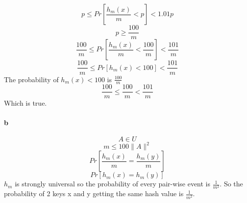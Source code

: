 \subsection*{}

\begin{equation}
    p \le Pr\left[ \frac{h_{m}(x)}{m} < p \right] < 1.01p
\end{equation}
\begin{equation}
    p \ge \frac{100}{m}
\end{equation}
\begin{equation}
    \frac{100}{m} \le Pr\left[ \frac{h_{m}(x)}{m} < \frac{100}{m} \right] < \frac{101}{m}
\end{equation}
\begin{equation}
    \frac{100}{m} \le Pr\left[ h_{m}(x) < 100 \right] < \frac{101}{m}
\end{equation}
The probability of $h_m(x) < 100$ is $\frac{100}{m}$
\begin{equation}
    \frac{100}{m} \le \frac{100}{m} < \frac{101}{m}
\end{equation}
Which is true.


\paragraph{b}
\begin{equation}
    A \in U
\end{equation}
\begin{equation}
    m \le 100\|A\|^{2}
\end{equation}
\begin{equation}
    Pr \left[ \frac{h_m(x)}{m} = \frac{h_m(y)}{m}\right]
\end{equation}
\begin{equation}
    Pr \left[ h_m(x) = h_m(y) \right]
\end{equation}
$h_m$ is strongly universal so the probability of every pair-wise event is $\frac{1}{m^{2}}$.
So the probability of 2 keys x and y getting the same hash value is $\frac{1}{m^{2}}$.



